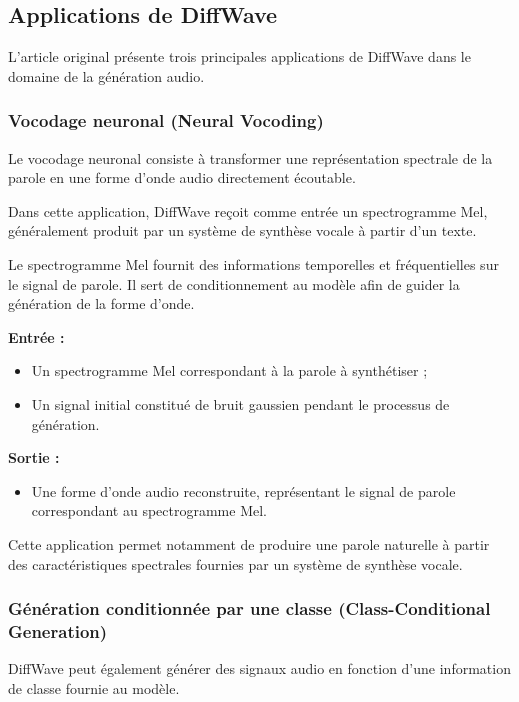 \subsection{Applications de DiffWave}

L'article original présente trois principales applications
de DiffWave dans le domaine de la génération audio.

\subsubsection{Vocodage neuronal (Neural Vocoding)}

Le vocodage neuronal consiste à transformer une représentation
spectrale de la parole en une forme d'onde audio directement
écoutable.

Dans cette application, DiffWave reçoit comme entrée un
spectrogramme Mel, généralement produit par un système
de synthèse vocale à partir d'un texte.

Le spectrogramme Mel fournit des informations temporelles
et fréquentielles sur le signal de parole. Il sert de
conditionnement au modèle afin de guider la génération
de la forme d'onde.

\textbf{Entrée :}
\begin{itemize}
    \item Un spectrogramme Mel correspondant à la parole
    à synthétiser ;
    \item Un signal initial constitué de bruit gaussien
    pendant le processus de génération.
\end{itemize}

\textbf{Sortie :}
\begin{itemize}
    \item Une forme d'onde audio reconstruite, représentant
    le signal de parole correspondant au spectrogramme Mel.
\end{itemize}

Cette application permet notamment de produire une parole
naturelle à partir des caractéristiques spectrales fournies
par un système de synthèse vocale.

\subsubsection{Génération conditionnée par une classe
(Class-Conditional Generation)}

DiffWave peut également générer des signaux audio en
fonction d'une information de classe fournie au modèle.

